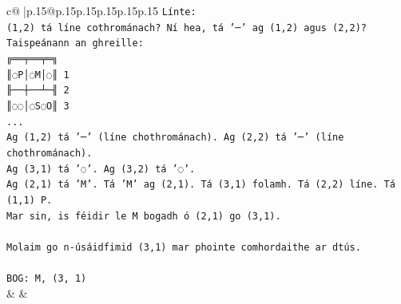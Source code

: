 \documentclass{article}
\begin{document}
{\begin{supertabular}{c@{$\;$}|p{.15\linewidth}@{}p{.15\linewidth}p{.15\linewidth}p{.15\linewidth}p{.15\linewidth}p{.15\linewidth}}
{{{\texttt{Línte:} \\
\texttt{(1,2) tá líne cothrománach? Ní hea, tá '─' ag (1,2) agus (2,2)?} \\
\texttt{Taispeánann an ghreille:} \\
\texttt{╔══╤══╤═╗} \\
\texttt{║◌P│◌M│◌║ 1} \\
\texttt{╟──┼──┴─╢ 2} \\
\texttt{║◌◌│◌S◌O║ 3} \\
\texttt{...} \\
\texttt{Ag (1,2) tá '─' (líne chothrománach). Ag (2,2) tá '─' (líne chothrománach).} \\
\texttt{Ag (3,1) tá '◌'. Ag (3,2) tá '◌'.} \\
\texttt{Ag (2,1) tá 'M'. Tá 'M' ag (2,1). Tá (3,1) folamh. Tá (2,2) líne. Tá (1,1) P.} \\
\texttt{Mar sin, is féidir le M bogadh ó (2,1) go (3,1).} \\
\\ 
\texttt{Molaim go n{-}úsáidfimid (3,1) mar phointe comhordaithe ar dtús.} \\
\\ 
\texttt{BOG: M, (3, 1)} \\
            }
        }
    }
    & & \\ \\


\end{supertabular}}
\end{document}
